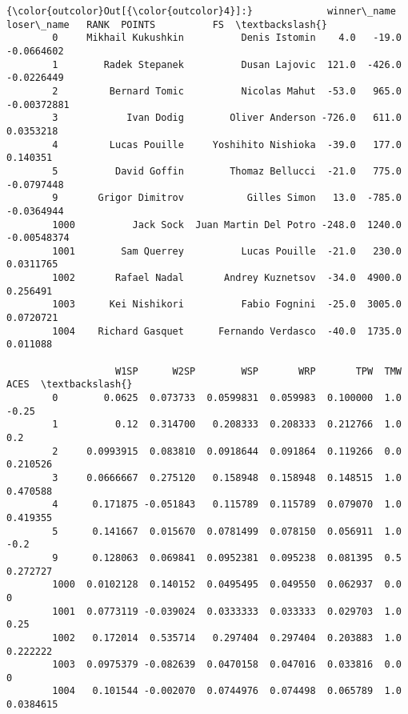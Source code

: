 \documentclass[11pt]{article}
\begin{document}
\begin{Verbatim}[commandchars=\\\{\}]
{\color{outcolor}Out[{\color{outcolor}4}]:}             winner\_name             loser\_name   RANK  POINTS          FS  \textbackslash{}
        0     Mikhail Kukushkin          Denis Istomin    4.0   -19.0  -0.0664602   
        1        Radek Stepanek          Dusan Lajovic  121.0  -426.0  -0.0226449   
        2         Bernard Tomic          Nicolas Mahut  -53.0   965.0 -0.00372881   
        3            Ivan Dodig        Oliver Anderson -726.0   611.0   0.0353218   
        4         Lucas Pouille     Yoshihito Nishioka  -39.0   177.0    0.140351   
        5          David Goffin        Thomaz Bellucci  -21.0   775.0  -0.0797448   
        9       Grigor Dimitrov           Gilles Simon   13.0  -785.0  -0.0364944   
        1000          Jack Sock  Juan Martin Del Potro -248.0  1240.0 -0.00548374   
        1001        Sam Querrey          Lucas Pouille  -21.0   230.0   0.0311765   
        1002       Rafael Nadal       Andrey Kuznetsov  -34.0  4900.0    0.256491   
        1003      Kei Nishikori          Fabio Fognini  -25.0  3005.0   0.0720721   
        1004    Richard Gasquet      Fernando Verdasco  -40.0  1735.0    0.011088   
        
                   W1SP      W2SP        WSP       WRP       TPW  TMW       ACES  \textbackslash{}
        0        0.0625  0.073733  0.0599831  0.059983  0.100000  1.0      -0.25   
        1          0.12  0.314700   0.208333  0.208333  0.212766  1.0        0.2   
        2     0.0993915  0.083810  0.0918644  0.091864  0.119266  0.0   0.210526   
        3     0.0666667  0.275120   0.158948  0.158948  0.148515  1.0   0.470588   
        4      0.171875 -0.051843   0.115789  0.115789  0.079070  1.0   0.419355   
        5      0.141667  0.015670  0.0781499  0.078150  0.056911  1.0       -0.2   
        9      0.128063  0.069841  0.0952381  0.095238  0.081395  0.5   0.272727   
        1000  0.0102128  0.140152  0.0495495  0.049550  0.062937  0.0          0   
        1001  0.0773119 -0.039024  0.0333333  0.033333  0.029703  1.0       0.25   
        1002   0.172014  0.535714   0.297404  0.297404  0.203883  1.0   0.222222   
        1003  0.0975379 -0.082639  0.0470158  0.047016  0.033816  0.0          0   
        1004   0.101544 -0.002070  0.0744976  0.074498  0.065789  1.0  0.0384615   
        

\end{Verbatim}
\end{document}
